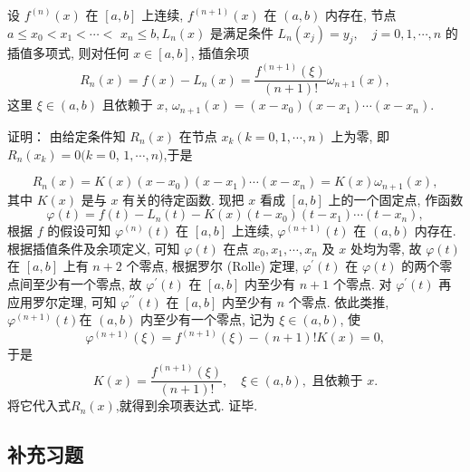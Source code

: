 \begin{tcolorbox}[breakable,title=定理]
 设 $ f^{(n)}(x) $ 在 $ [a, b] $ 上连续, $ f^{(n+1)}(x) $ 在 $ (a, b) $ 内存在, 节点 $ a \leqslant x_{0}<x_{1}<\cdots< $ $ x_{n} \leqslant b, L_{n}(x) $ 是满足条件 $L_{n}\left(x_{j}\right)=y_{j}, \quad j=0,1, \cdots, n$ 的插值多项式, 则对任何 $ x \in[a, b] $, 插值余项
$$
R_{n}(x)=f(x)-L_{n}(x)=\frac{f^{(n+1)}(\xi)}{(n+1) !} \omega_{n+1}(x),
$$
这里 $ \xi \in(a, b) $ 且依赖于 $ x$, $\omega_{n+1}(x)=\left(x-x_{0}\right)\left(x-x_{1}\right) \cdots\left(x-x_{n}\right)$.

\tcblower
证明： 由给定条件知 $ R_{n}(x) $ 在节点 $ x_{k}(k=0,1, \cdots, n) $ 上为零, 即 $ R_{n}\left(x_{k}\right)=0(k=0 $, $ 1, \cdots, n) $,于是

$$
R_{n}(x)=K(x)\left(x-x_{0}\right)\left(x-x_{1}\right) \cdots\left(x-x_{n}\right)=K(x) \omega_{n+1}(x),
$$
其中 $ K(x) $ 是与 $ x $ 有关的待定函数.
现把 $ x $ 看成 $ [a, b] $ 上的一个固定点, 作函数
$$
\varphi(t)=f(t)-L_{n}(t)-K(x)\left(t-x_{0}\right)\left(t-x_{1}\right) \cdots\left(t-x_{n}\right),
$$
根据 $ f $ 的假设可知 $ \varphi^{(n)}(t) $ 在 $ [a, b] $ 上连续, $ \varphi^{(n+1)}(t) $ 在 $ (a, b) $ 内存在. 根据插值条件及余项定义, 可知 $ \varphi(t) $ 在点 $ x_{0}, x_{1}, \cdots, x_{n} $ 及 $ x $ 处均为零, 故 $ \varphi(t) $ 在 $ [a, b] $ 上有 $ n+2 $ 个零点, 根据罗尔 (Rolle) 定理, $ \varphi^{\prime}(t) $ 在 $ \varphi(t) $ 的两个零点间至少有一个零点, 故 $ \varphi^{\prime}(t) $ 在 $ [a, b] $ 内至少有 $ n+1 $ 个零点. 对 $ \varphi^{\prime}(t) $ 再应用罗尔定理, 可知 $ \varphi^{\prime \prime}(t) $ 在 $ [a, b] $ 内至少有 $ n $ 个零点. 依此类推, $ \varphi^{(n+1)}(t) $在 $ (a, b) $ 内至少有一个零点, 记为 $ \xi \in(a, b) $, 使
$$
\varphi^{(n+1)}(\xi)=f^{(n+1)}(\xi)-(n+1) ! K(x)=0,
$$
于是
$$
K(x)=\frac{f^{(n+1)}(\xi)}{(n+1) !}, \quad \xi \in(a, b), \text { 且依赖于 } x .
$$
将它代入式$R_n(x)$,就得到余项表达式. 证毕.
\end{tcolorbox}



\subsection{补充习题}

